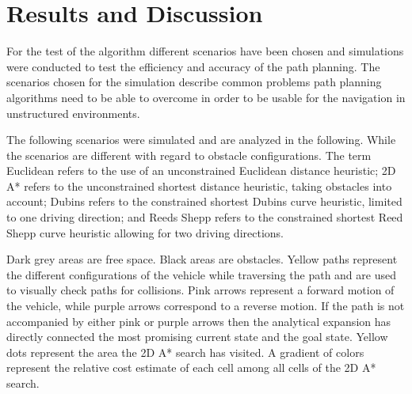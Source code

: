 \chapter{Results and Discussion}\label{chap:resultsAndDiscussion}
For the test of the algorithm different scenarios have been chosen and simulations were conducted to test the efficiency and accuracy of the path planning. The scenarios chosen for the simulation describe common problems path planning algorithms need to be able to overcome in order to be usable for the navigation in unstructured environments.

The following scenarios were simulated and are analyzed in the following. While the scenarios are different with regard to obstacle configurations. The term Euclidean refers to the use of an unconstrained Euclidean distance heuristic; 2D A* refers to the unconstrained shortest distance heuristic, taking obstacles into account; Dubins refers to the constrained shortest Dubins curve heuristic, limited to one driving direction; and Reeds Shepp refers to the constrained shortest Reed Shepp curve heuristic allowing for two driving directions.

Dark grey areas are free space. Black areas are obstacles. Yellow paths represent the different configurations of the vehicle while traversing the path and are used to visually check paths for collisions. Pink arrows represent a forward motion of the vehicle, while purple arrows correspond to a reverse motion. If the path is not accompanied by either pink or purple arrows then the analytical expansion has directly connected the most promising current state and the goal state. Yellow dots represent the area the 2D A* search has visited. A gradient of colors represent the relative cost estimate of each cell among all cells of the 2D A* search.


%
%

